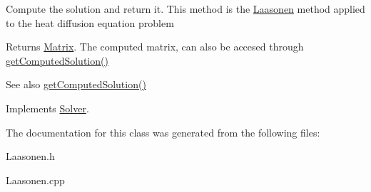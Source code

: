 Compute the solution and return it. This method is the \mbox{\hyperlink{classLaasonen}{Laasonen}} method applied to the heat diffusion equation problem \begin{DoxyReturn}{Returns}
\mbox{\hyperlink{classMatrix}{Matrix}}. The computed matrix, can also be accesed through \mbox{\hyperlink{classSolver_aafe88ce4130c001052e5d93c1681f90f}{get\+Computed\+Solution()}} 
\end{DoxyReturn}
\begin{DoxySeeAlso}{See also}
\mbox{\hyperlink{classSolver_aafe88ce4130c001052e5d93c1681f90f}{get\+Computed\+Solution()}} 
\end{DoxySeeAlso}


Implements \mbox{\hyperlink{classSolver_a0f4ecfaed825407019995b5176e25748}{Solver}}.



The documentation for this class was generated from the following files\+:\begin{DoxyCompactItemize}
\item 
Laasonen.\+h\item 
Laasonen.\+cpp\end{DoxyCompactItemize}
